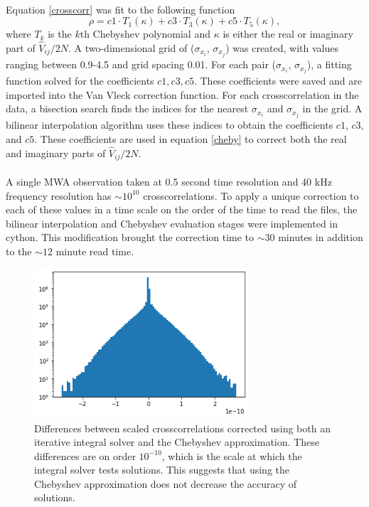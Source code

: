 \documentclass[11pt]{article}
\begin{document}
\paragraph{}
Equation \eqref{crosscorr} was fit to the following function
\begin{equation}\label{cheby}
\rho=c1 \cdot T_1(\kappa) + c3 \cdot T_3(\kappa) + c5 \cdot T_5(\kappa),
\end{equation}
where $T_k$ is the $k$th Chebyshev polynomial and $\kappa$ is either the real or imaginary part of $\hat V_{ij}/2N$. A two-dimensional grid of ($\sigma_{x_i}$, $\sigma_{x_j}$) was created, with values ranging between 0.9-4.5 and grid spacing 0.01. For each pair ($\sigma_{x_i}$, $\sigma_{x_j}$), a fitting function solved for the coefficients $c1, c3, c5$. These coefficients were saved and are imported into the Van Vleck correction function. For each crosscorrelation in the data, a bisection search finds the indices for the nearest $\sigma_{x_i}$ and $\sigma_{x_j}$ in the grid. A bilinear interpolation algorithm uses these indices to obtain the coefficients $c1$, $c3$, and $c5$. These coefficients are used in equation \eqref{cheby} to correct both the real and imaginary parts of $\hat V_{ij}/2N$.

\paragraph{}
A single MWA observation taken at 0.5 second time resolution and 40 kHz frequency resolution has $\sim10^{10}$ crosscorrelations. To apply a unique correction to each of these values in a time scale on the order of the time to read the files, the bilinear interpolation and Chebyshev evaluation stages were implemented in cython. This modification brought the correction time to $\sim30$ minutes in addition to the $\sim12$ minute read time.

\begin{figure}
\centering{}
\includegraphics[width=80mm]{cheby_approx.png}
\caption{Differences between scaled crosscorrelations corrected using both an iterative integral solver and the Chebyshev approximation. These differences are on order $10^{-10}$, which is the scale at which the integral solver tests solutions. This suggests that using the Chebyshev approximation does not decrease the accuracy of solutions.\label{cheby_approx}}
\end{figure}
\end{document}
